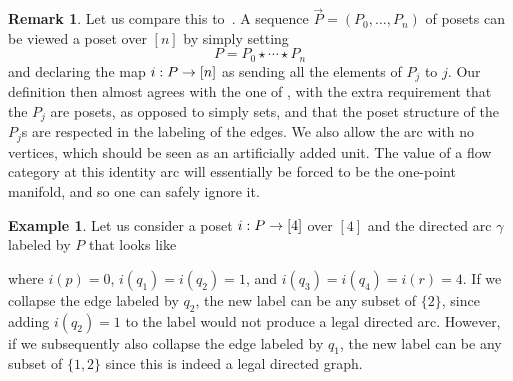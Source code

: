 \documentclass[10pt]{amsart}
\numberwithin{equation}{section}
\theoremstyle{definition}
\newtheorem{ex}[prop]{Example}
\newtheorem{rem}[prop]{Remark}
\newcommand{\join}{\star}
\renewcommand{\to}{\mathchoice{\longrightarrow}{\rightarrow}{}{}}
\begin{document}
\begin{rem}\label{rem:A_P_comparison}
	Let us compare this to~\cite[Definition 4.2]{AB}.
	A sequence $\overrightarrow{P} = (P_0,\dots ,P_n)$ of posets can be viewed a poset over $[n]$ by simply setting
	\[
	P = P_0 \join \cdots \join P_n
	\]
	and declaring the map $i : P \to [n]$ as sending all the elements of $P_j$ to $j$.
	Our definition then almost agrees with the one of \cite{AB}, with the extra requirement that the $P_j$ are posets, as opposed to simply sets, and that the poset structure of the $P_j$s are respected in the labeling of the edges.
	We also allow the arc with no vertices, which should be seen as an artificially added unit.
	The value of a flow category at this identity arc will essentially be forced to be the one-point manifold, and so one can safely ignore it.
\end{rem}

\begin{ex}
	Let us consider a poset $i : P \to [4]$ over $[4]$ and the directed arc $\gamma$ labeled by $P$ that looks like
	\begin{center}
	\end{center}
	where $i(p) = 0$, $i(q_1) = i(q_2)=1$, and $i(q_3) =  i(q_4) = i(r) =4$.
	If we collapse the edge labeled by $q_2$, the new label can be any subset of $\{2\}$, since adding $i(q_2) = 1$ to the label would not produce a legal directed arc.
	However, if we subsequently also collapse the edge labeled by $q_1$, the new label can be any subset of $\{1,2\}$ since this is indeed a legal directed graph.
\end{ex}
\end{document}
